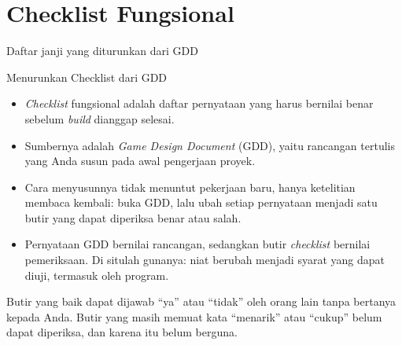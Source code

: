 \documentclass[aspectratio=169,10pt]{beamer}
\begin{document}
\section{Checklist Fungsional}
  {Daftar janji yang diturunkan dari GDD}

\begin{frame}{Menurunkan Checklist dari GDD}
\begin{itemize}
  \item \emph{Checklist} fungsional adalah daftar pernyataan yang harus
        bernilai benar sebelum \emph{build} dianggap selesai.
  \item Sumbernya adalah \emph{Game Design Document} (GDD), yaitu rancangan
        tertulis yang Anda susun pada awal pengerjaan proyek.
  \item Cara menyusunnya tidak menuntut pekerjaan baru, hanya ketelitian
        membaca kembali: buka GDD, lalu ubah setiap pernyataan menjadi satu
        butir yang dapat diperiksa benar atau salah.
  \item Pernyataan GDD bernilai rancangan, sedangkan butir \emph{checklist}
        bernilai pemeriksaan. Di situlah gunanya: niat berubah menjadi syarat
        yang dapat diuji, termasuk oleh program.
\end{itemize}
\vspace{0.14cm}
\begin{kiat}
Butir yang baik dapat dijawab ``ya'' atau ``tidak'' oleh orang lain tanpa
bertanya kepada Anda. Butir yang masih memuat kata ``menarik'' atau ``cukup''
belum dapat diperiksa, dan karena itu belum berguna.
\end{kiat}
\end{frame}
\end{document}
